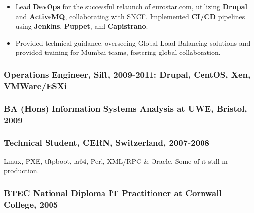 \documentclass[
]{article}
\begin{document}
\begin{itemize}
\item
  Lead \textbf{DevOps} for the successful relaunch of eurostar.com,
  utilizing \textbf{Drupal} and \textbf{ActiveMQ}, collaborating with
  SNCF. Implemented \textbf{CI/CD} pipelines using \textbf{Jenkins},
  \textbf{Puppet}, and \textbf{Capistrano}.
\item
  Provided technical guidance, overseeing Global Load Balancing
  solutions and provided training for Mumbai teams, fostering global
  collaboration.
\end{itemize}

\hypertarget{material-office-building-operations-engineer-sift-2009-2011-drupal-centos-xen-vmwareesxi}{%
\subsubsection{\texorpdfstring{\faBuilding Operations Engineer, Sift,
2009-2011: Drupal, CentOS, Xen,
VMWare/ESXi}{ Operations Engineer, Sift, 2009-2011: Drupal, CentOS, Xen, VMWare/ESXi}}\label{material-office-building-operations-engineer-sift-2009-2011-drupal-centos-xen-vmwareesxi}}

\hypertarget{material-school-ba-hons-information-systems-analysis-at-uwe-bristol-2009}{%
\subsubsection{\texorpdfstring{\faSchool BA (Hons) Information Systems
Analysis at UWE, Bristol,
2009}{ BA (Hons) Information Systems Analysis at UWE, Bristol, 2009}}\label{material-school-ba-hons-information-systems-analysis-at-uwe-bristol-2009}}

\hypertarget{material-atom-technical-student-cern-switzerland-2007-2008}{%
\subsubsection{\texorpdfstring{\faAtom Technical Student, CERN,
Switzerland,
2007-2008}{ Technical Student, CERN, Switzerland, 2007-2008}}\label{material-atom-technical-student-cern-switzerland-2007-2008}}

Linux, PXE, tftpboot, ia64, Perl, XML/RPC \& Oracle. Some of it still in
production.

\hypertarget{material-school-btec-national-diploma-it-practitioner-at-cornwall-college-2005}{%
\subsubsection{\texorpdfstring{\faSchool BTEC National Diploma IT
Practitioner at Cornwall College,
2005}{ BTEC National Diploma IT Practitioner at Cornwall College, 2005}}\label{material-school-btec-national-diploma-it-practitioner-at-cornwall-college-2005}}
\end{document}
